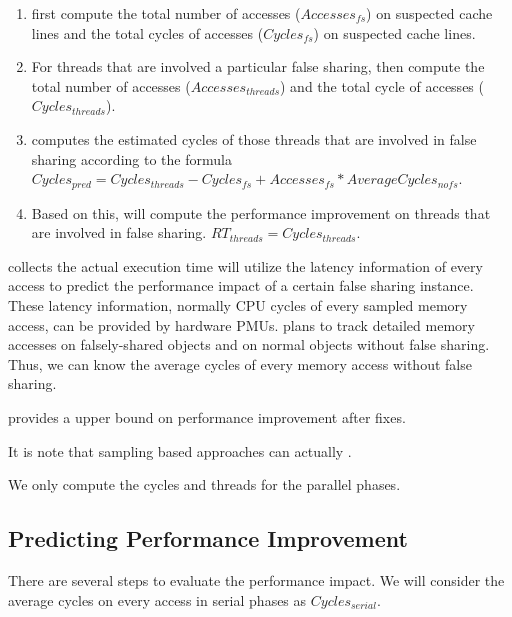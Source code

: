 \begin{enumerate}
\item \cheetah{} first compute the total number of accesses ($Accesses_{fs}$) on suspected cache lines and the total cycles of accesses ($Cycles_{fs}$) on suspected cache lines.

\item For threads that are involved a particular false sharing, \cheetah{} then compute the total number of accesses ($Accesses_{threads}$) and the total cycle of accesses ($Cycles_{threads}$). 

\item \Cheetah{} computes the estimated cycles of those threads that are involved in false sharing according to the formula $Cycles_{pred} = Cycles_{threads} - Cycles_{fs} + Accesses_{fs} * AverageCycles_{nofs}$. 

\item  Based on this, \cheetah{} will compute the performance improvement on threads that are involved in false sharing.
$RT_{threads} = Cycles_{threads}  $. 

\end{enumerate}



\cheetah{} collects the actual execution time 
\cheetah{} will utilize the latency information of every access to predict the performance impact of a certain false sharing instance. These latency information, normally CPU cycles of every sampled memory access, can be provided by hardware PMUs. \Cheetah{} plans to track detailed memory accesses on falsely-shared objects and on normal objects without false sharing. Thus, we can know the average cycles of every memory access without false sharing. 

\cheetah{} provides a upper bound on performance improvement after fixes. 

It is note that sampling based approaches can actually 
.

We only compute the cycles and threads for the parallel phases. 

\subsection{Predicting Performance Improvement}

There are several steps to evaluate the performance impact. We will consider the average cycles on every access in serial phases as $Cycles_{serial}$. 


